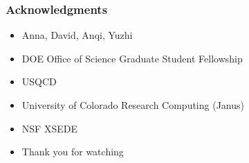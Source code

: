 \begin{frame}
  \frametitle{Acknowledgments}
  \begin{itemize}
    \item{Anna, David, Anqi, Yuzhi}
    \item{DOE Office of Science Graduate Student Fellowship}
    \item{USQCD}
    \item{University of Colorado Research Computing (Janus)}
    \item{NSF XSEDE}
    \item{Thank you for watching}
  \end{itemize}
\end{frame}
